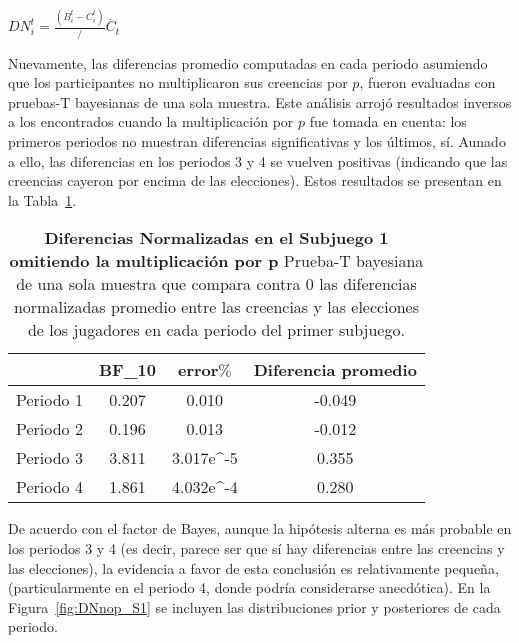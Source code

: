 \begin{center}
$DN_i^t=  \frac{(B_i^t- C_i^t)}/{\overline{C}_t}$ \\
\end{center}

Nuevamente, las diferencias promedio computadas en cada periodo asumiendo que los participantes no multiplicaron sus creencias por $p$, fueron evaluadas con pruebas-T bayesianas de una sola muestra.  Este análisis arrojó resultados inversos a los encontrados cuando la multiplicación por $p$ fue tomada en cuenta: los primeros periodos no muestran diferencias significativas y los últimos, sí.  Aunado a ello, las diferencias en los periodos 3 y 4 se vuelven positivas (indicando que las creencias cayeron por encima de las elecciones). Estos resultados se presentan en la Tabla~\ref{DNnop-S1-B}.\\


\begin{table}[h]
\caption[Prueba t de una muestra: Diferencias Normalizadas en el Subjuego 1 sin la multiplicación por p]{\textbf{Diferencias Normalizadas en el Subjuego 1 omitiendo la multiplicación por p} Prueba-T bayesiana de una sola muestra que compara contra 0 las diferencias normalizadas promedio entre las creencias y las elecciones de los jugadores en cada periodo del primer subjuego.}
\label{DNnop-S1-B}
\centering
\begin{tabular}{l | c c | c}
\toprule
\textbf{} & \textbf{BF_10} & \textbf{error$\%$} & \textbf{Diferencia promedio}\\
\midrule
Periodo 1 & 0.207 & 0.010 & -0.049\\
Periodo 2 & 0.196 & 0.013 & -0.012\\
Periodo 3 & 3.811 & 3.017e^-5 & 0.355\\
Periodo 4 & 1.861 & 4.032e^-4 & 0.280\\
\bottomrule
\end{tabular}
\end{table}

De acuerdo con el factor de Bayes, aunque la hipótesis alterna es más probable en los periodos 3 y 4 (es decir, parece ser que sí hay diferencias entre las creencias y las elecciones), la evidencia a favor de esta conclusión es relativamente pequeña, (particularmente en el periodo 4, donde podría considerarse anecdótica). En la Figura~\ref{fig:DNnop_S1} se incluyen las distribuciones prior y posteriores de cada periodo.\\

